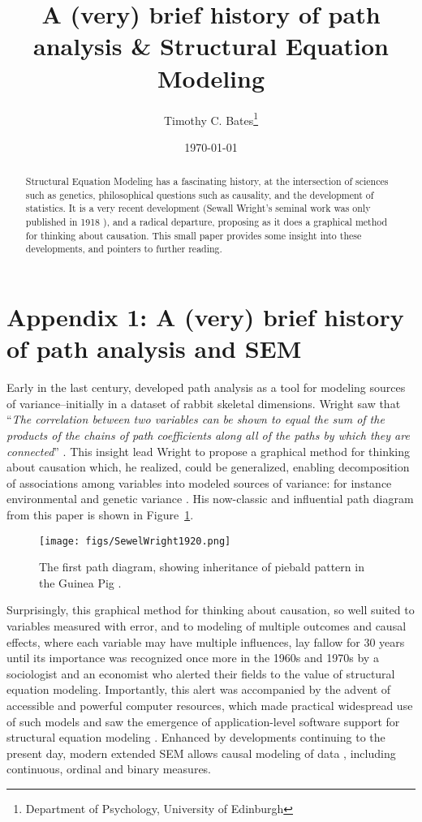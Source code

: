 \documentclass{article}
\title{A (very) brief history of path analysis \&{} Structural Equation Modeling}
\author{Timothy C. Bates\footnote{Department of Psychology, University of Edinburgh}}
\date{\today}
\begin{document}
\maketitle

\begin{abstract}
Structural Equation Modeling has a fascinating history, at the intersection of sciences such as genetics, philosophical questions such as causality, and the development of statistics. It is a very recent development (Sewall Wright's seminal work was only published in 1918 \citet{Wright1918}), and a radical departure, proposing as it does a graphical method for thinking about causation. This small paper provides some insight into these developments, and pointers to further reading.
\end{abstract}

\section{Appendix 1: A (very) brief history of path analysis and SEM} %
\label{sec:sec_appendix1}

Early in the last century, \citet{Wright1918} developed path analysis as a tool for modeling sources of variance--initially in a dataset of rabbit skeletal dimensions. Wright saw that ``\emph{The correlation between two variables can be shown to equal the sum of the products of the chains of path coefficients along all of the paths by which they are connected}'' \citep[p. 115]{Wright1920}. This insight lead Wright to propose a graphical method for thinking about causation which, he realized, could be generalized, enabling decomposition of associations among variables into modeled sources of variance: for instance environmental and genetic variance \citep{Wright1920}. His now-classic and influential path diagram from this paper is shown in Figure~\ref{figure:SewellWrightpiebald}.

\begin{figure}[htbp]
	\centering
  	\texttt{[image: figs/SewelWright1920.png]}
	\caption{The first path diagram, showing inheritance of piebald pattern in the Guinea Pig \citep{Wright1920}.}
	\label{figure:SewellWrightpiebald}
\end{figure}

Surprisingly, this graphical method for thinking about causation, so well suited to variables measured with error, and to modeling of multiple outcomes and causal effects, where each variable may have multiple influences, lay fallow for 30 years until its importance was recognized once more in the 1960s and 1970s by a sociologist \citep{Duncan1996} and an economist \citep{Goldberger1971} who alerted their fields to the value of structural equation modeling. Importantly, this alert was accompanied by the advent of accessible and powerful computer resources, which made practical widespread use of such models and saw the emergence of application-level software support for structural equation modeling \citep[]{Joreskog1969a}. Enhanced by developments continuing to the present day, modern extended SEM allows causal modeling of data \citep{Pearl2009}, including continuous, ordinal and binary measures. 
\end{document}
